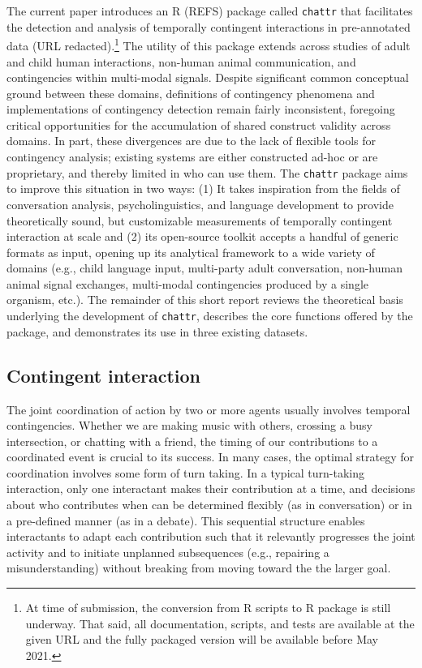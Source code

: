 \documentclass[10pt, letterpaper]{article}
\begin{document}
The current paper introduces an R (REFS) package called \texttt{chattr}
that facilitates the detection and analysis of temporally contingent
interactions in pre-annotated data (URL redacted).\footnote{At time of
  submission, the conversion from R scripts to R package is still
  underway. That said, all documentation, scripts, and tests are
  available at the given URL and the fully packaged version will be
  available before May 2021.} The utility of this package extends across
studies of adult and child human interactions, non-human animal
communication, and contingencies within multi-modal signals. Despite
significant common conceptual ground between these domains, definitions
of contingency phenomena and implementations of contingency detection
remain fairly inconsistent, foregoing critical opportunities for the
accumulation of shared construct validity across domains. In part, these
divergences are due to the lack of flexible tools for contingency
analysis; existing systems are either constructed ad-hoc or are
proprietary, and thereby limited in who can use them. The
\texttt{chattr} package aims to improve this situation in two ways: (1)
It takes inspiration from the fields of conversation analysis,
psycholinguistics, and language development to provide theoretically
sound, but customizable measurements of temporally contingent
interaction at scale and (2) its open-source toolkit accepts a handful
of generic formats as input, opening up its analytical framework to a
wide variety of domains (e.g., child language input, multi-party adult
conversation, non-human animal signal exchanges, multi-modal
contingencies produced by a single organism, etc.). The remainder of
this short report reviews the theoretical basis underlying the
development of \texttt{chattr}, describes the core functions offered by
the package, and demonstrates its use in three existing datasets.

\hypertarget{contingent-interaction}{%
\subsection{Contingent interaction}\label{contingent-interaction}}

The joint coordination of action by two or more agents usually involves
temporal contingencies. Whether we are making music with others,
crossing a busy intersection, or chatting with a friend, the timing of
our contributions to a coordinated event is crucial to its success. In
many cases, the optimal strategy for coordination involves some form of
turn taking. In a typical turn-taking interaction, only one interactant
makes their contribution at a time, and decisions about who contributes
when can be determined flexibly (as in conversation) or in a pre-defined
manner (as in a debate). This sequential structure enables interactants
to adapt each contribution such that it relevantly progresses the joint
activity and to initiate unplanned subsequences (e.g., repairing a
misunderstanding) without breaking from moving toward the the larger
goal.
\end{document}
